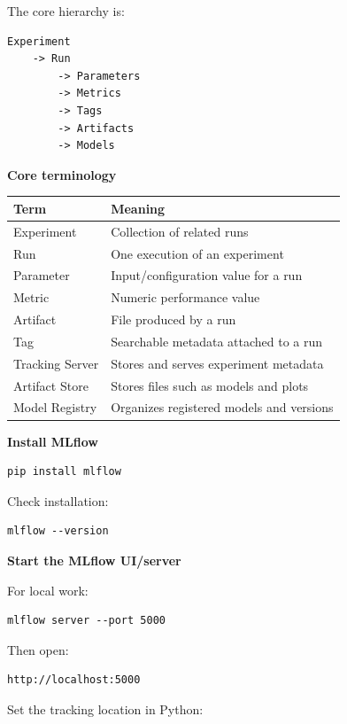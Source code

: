 \documentclass[11pt,letterpaper]{article}
\begin{document}
The core hierarchy is:

\begin{lstlisting}
Experiment
    -> Run
        -> Parameters
        -> Metrics
        -> Tags
        -> Artifacts
        -> Models
\end{lstlisting}

\textbf{Core terminology}

\begin{center}
\begin{tabularx}{\textwidth}{lX}
\toprule
Term & Meaning \\
\midrule
Experiment & Collection of related runs \\
Run & One execution of an experiment \\
Parameter & Input/configuration value for a run \\
Metric & Numeric performance value \\
Artifact & File produced by a run \\
Tag & Searchable metadata attached to a run \\
Tracking Server & Stores and serves experiment metadata \\
Artifact Store & Stores files such as models and plots \\
Model Registry & Organizes registered models and versions \\
\bottomrule
\end{tabularx}
\end{center}

\textbf{Install MLflow}

\begin{lstlisting}
pip install mlflow
\end{lstlisting}

Check installation:

\begin{lstlisting}
mlflow --version
\end{lstlisting}

\textbf{Start the MLflow UI/server}

For local work:

\begin{lstlisting}
mlflow server --port 5000
\end{lstlisting}

Then open:

\begin{lstlisting}
http://localhost:5000
\end{lstlisting}

Set the tracking location in Python:
\end{document}
